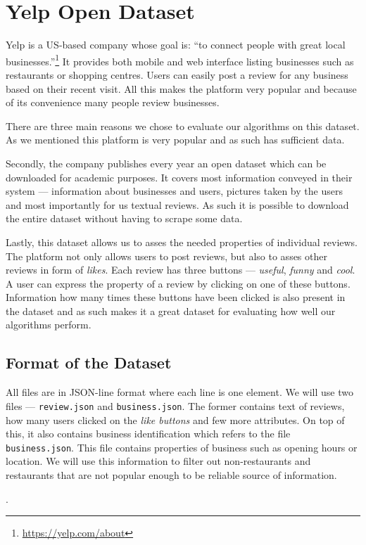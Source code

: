 \chapter{Yelp Open Dataset}

Yelp is a US-based company whose goal is: ``to connect people with great local businesses.''\footnote{\url{https://yelp.com/about}}
It provides both mobile and web interface listing businesses such as restaurants or shopping centres.
Users can easily post a review for any business based on their recent visit.
All this makes the platform very popular and because of its convenience many people review businesses.

There are three main reasons we chose to evaluate our algorithms on this dataset.
As we mentioned this platform is very popular and as such has sufficient data.

Secondly, the company publishes every year an open dataset which can be downloaded for academic
purposes.
It covers most information conveyed in their system ---  information about businesses and users, pictures taken by the users and most importantly for us textual reviews.
As such it is possible to download the entire dataset without having to scrape some data.

Lastly, this dataset allows us to asses the needed properties of individual reviews.
The platform not only allows users to post reviews, but also to asses other reviews in form of \emph{likes}.
Each review has three buttons --- \emph{useful}, \emph{funny} and \emph{cool}.
A user can express the property of a review by clicking on one of these buttons. Information how many times these buttons have been clicked is also present in the dataset and as such makes it a great dataset for evaluating how well our algorithms perform.

\section{Format of the Dataset}

All files are in JSON-line format where each line is one element. We will use two files --- \texttt{review.json} and \texttt{business.json}. The former contains text of reviews, how many users clicked on the \emph{like buttons} and few more attributes. On top of this, it also contains business identification which refers to the file \texttt{business.json}. This file contains properties of business such as opening hours or location. We will use this information to filter out non-restaurants and restaurants that are not popular enough to be reliable source of information.

.  
